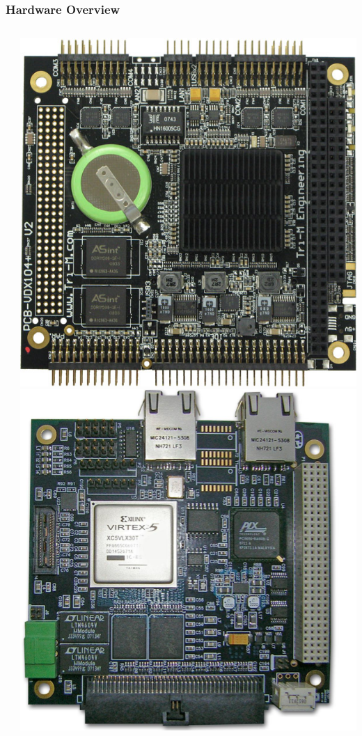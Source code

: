 \documentclass[landscape,xcolor={table}]{beamer}
\begin{document}
	\begin{frame}
		
		\frametitle{Hardware Overview}
		
		\begin{columns}[T] %
		\begin{column}{.68\textwidth}


			
		\end{column}%
		\hfill%
		\begin{column}{.30\textwidth}

			\includegraphics[width=\textwidth]{images/vdx104} \\
			\includegraphics[width=\textwidth]{images/fpga}
					

\end{column}
\end{columns}
\end{frame}
\end{document}
